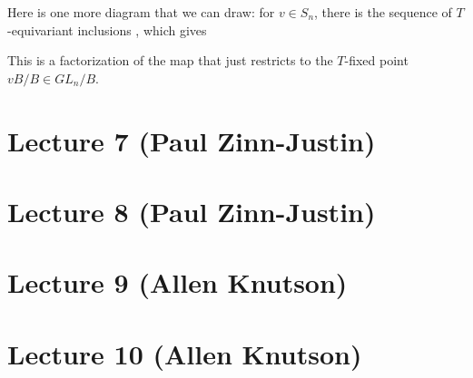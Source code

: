 \documentclass[12pt]{amsart}
\numberwithin{equation}{section}
\theoremstyle{definition}
\numberwithin{figure}{section}
\begin{document}
Here is one more diagram that we can draw: for $v\in S_n$, there is the sequence of $T$-equivariant inclusions , which gives

\begin{center}
\end{center}
This is a factorization of the map that just restricts to the $T$-fixed point $vB/B \in GL_n/B$.

\section{Lecture 7 (Paul Zinn-Justin)}

\section{Lecture 8 (Paul Zinn-Justin)}

\section{Lecture 9 (Allen Knutson)}

\section{Lecture 10 (Allen Knutson)}
\end{document}
